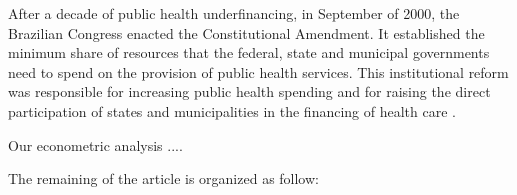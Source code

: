After a decade of public health underfinancing, in September of 2000, the Brazilian Congress enacted the  Constitutional Amendment. It established the minimum share of resources that the federal, state and municipal governments need to spend on the provision of public health services. This institutional reform was responsible for increasing public health spending and for raising the direct participation of states and municipalities in the financing of health care \citep{Piola2013}.

Our econometric analysis ....

The remaining of the article is organized as follow: 


